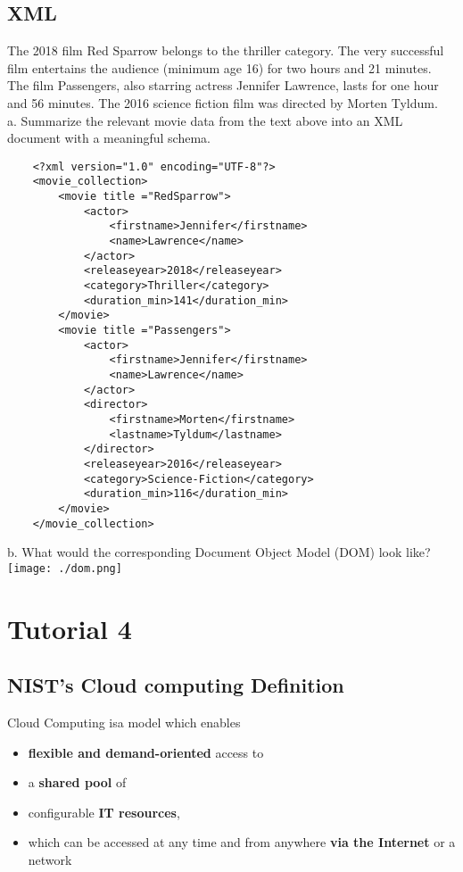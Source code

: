 \documentclass{article}
\begin{document}
\subsection{XML}
The 2018 film Red Sparrow belongs to the thriller category. The very successful film entertains the audience (minimum age 16) for two hours and 21 minutes. The film Passengers, also starring actress Jennifer Lawrence, lasts for one hour and 56 minutes. The 2016 science fiction film was directed by Morten Tyldum. \\
a. Summarize the relevant movie data from the text above into an XML document with a meaningful schema.
\begin{verbatim}
    <?xml version="1.0" encoding="UTF-8"?>
    <movie_collection>
        <movie title ="RedSparrow">
            <actor>
                <firstname>Jennifer</firstname>
                <name>Lawrence</name>
            </actor>
            <releaseyear>2018</releaseyear>
            <category>Thriller</category>
            <duration_min>141</duration_min>
        </movie>
        <movie title ="Passengers">
            <actor>
                <firstname>Jennifer</firstname>
                <name>Lawrence</name>
            </actor>
            <director>
                <firstname>Morten</firstname>
                <lastname>Tyldum</lastname>
            </director>
            <releaseyear>2016</releaseyear>
            <category>Science-Fiction</category>
            <duration_min>116</duration_min>
        </movie>
    </movie_collection>
\end{verbatim}
b. What would the corresponding Document Object Model (DOM) look like?
\texttt{[image: ./dom.png]}

\section{Tutorial 4}
\subsection{NIST's Cloud computing Definition}
Cloud Computing isa model which enables
\begin{itemize}
    \item \textbf{flexible and demand-oriented} access to
    \item a \textbf{shared pool} of
    \item configurable \textbf{IT resources},
    \item which can be accessed at any time and from anywhere \textbf{via the Internet} or a network
\end{itemize}
\end{document}
